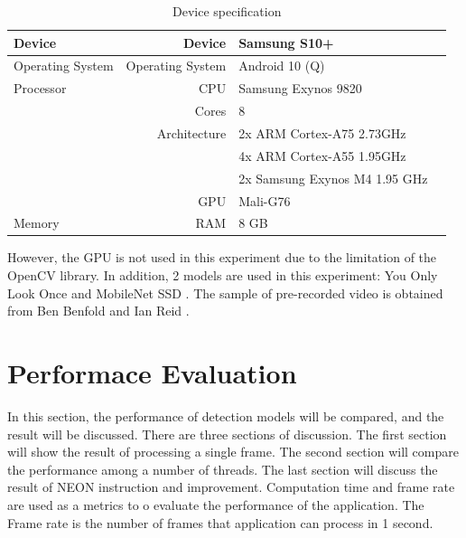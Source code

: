        \begin{table}[!htp]\centering
            \scriptsize
            \begin{tabular}{lrll}\toprule
                Device              &Device             &Samsung S10+ \\ \hline
                Operating System    &Operating System   &Android 10 (Q) \\ \hline
                Processor           &CPU                &Samsung Exynos 9820 \\
                                    &Cores              &8 \\
                                    &Architecture       &2x ARM Cortex-A75 2.73GHz \\
                                    &                   &4x ARM Cortex-A55 1.95GHz \\
                                    &                   &2x Samsung Exynos M4 1.95 GHz \\
                                    &GPU                &Mali-G76 \\ \hline
                Memory              &RAM                &8 GB \\
                \bottomrule
            \end{tabular}

            \caption{Device specification}\label{specification}
        \end{table}

        However, the GPU is not used in this experiment due to the limitation of the OpenCV library.
        In addition, 2 models are used in this experiment: You Only Look Once \cite{YOLO-v3} and MobileNet SSD \cite{mobilenet} \cite{ssd}.
        The sample of pre-recorded video is obtained from Ben Benfold and Ian Reid \cite{benfold2009attention}.

    \section{Performace Evaluation}
        In this section, the performance of detection models will be compared, and the result will be discussed.
        There are three sections of discussion. The first section will show the result of processing a single frame.
        The second section will compare the performance among a number of threads.
        The last section will discuss the result of NEON instruction and improvement.
        Computation time and frame rate are used as a metrics to o evaluate the performance of the application.
        The Frame rate is the number of frames that application can process in 1 second.

